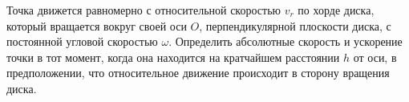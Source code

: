 Точка движется равномерно с относительной скоростью $v_r$ по хорде диска,
который вращается вокруг своей оси $O$, перпендикулярной плоскости диска,
с постоянной угловой скоростью $\omega$.
Определить абсолютные скорость и ускорение точки в тот момент,
когда она находится на кратчайшем расстоянии $h$ от оси,
в предположении, что относительное движение
происходит в сторону вращения диска.
